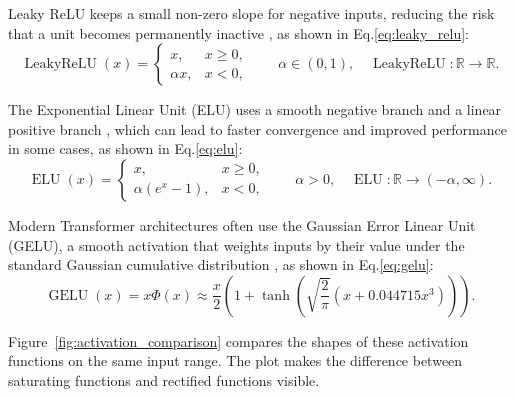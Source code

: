 Leaky ReLU keeps a small non-zero slope for negative inputs, reducing the risk that a unit becomes permanently inactive \cite{Maas2013}, as shown in Eq.\eqref{eq:leaky_relu}:
\begin{equation}
    \label{eq:leaky_relu}
    \operatorname{LeakyReLU}(x)=
    \begin{cases}
        x, & x \ge 0,\\
        \alpha x, & x<0,
    \end{cases}
    \qquad \alpha \in (0,1), \quad \operatorname{LeakyReLU}:\mathbb{R}\rightarrow\mathbb{R}.
\end{equation}

The Exponential Linear Unit (ELU) uses a smooth negative branch and a linear positive branch \cite{Clevert2016}, which can lead to faster convergence and improved performance in some cases, as shown in Eq.\eqref{eq:elu}:
\begin{equation}
    \label{eq:elu}
    \operatorname{ELU}(x)=
    \begin{cases}
        x, & x \ge 0,\\
        \alpha(e^x-1), & x<0,
    \end{cases}
    \qquad \alpha>0, \quad \operatorname{ELU}:\mathbb{R}\rightarrow(-\alpha,\infty).
\end{equation}

Modern Transformer architectures often use the Gaussian Error Linear Unit (GELU), a smooth activation that weights inputs by their value under the standard Gaussian cumulative distribution \cite{Hendrycks2016}, as shown in Eq.\eqref{eq:gelu}:
\begin{equation}
    \label{eq:gelu}
    \operatorname{GELU}(x)=x\Phi(x)\approx \frac{x}{2}\left(1+\tanh\left(\sqrt{\frac{2}{\pi}}(x+0.044715x^3)\right)\right).
\end{equation}

Figure~\ref{fig:activation_comparison} compares the shapes of these activation functions on the same input range. The plot makes the difference between saturating functions and rectified functions visible.

